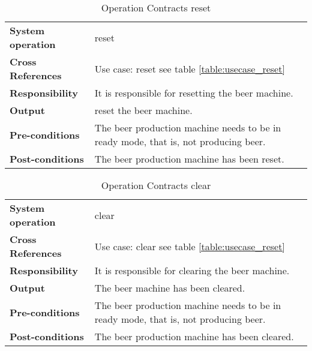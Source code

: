 \begin{table}[H]
    \begin{tabularx}{\textwidth}{|>{\RaggedRight}p{3.7cm}|>{\RaggedRight}X|}
        \hline
        \multicolumn{2}{|c|}{\textbf{reset}}\\
        \hline
        \textbf{System operation} & reset \\
        \hline
        \textbf{Cross References} & Use case: reset see table \ref{table:usecase_reset} \\
        \hline
        \textbf{Responsibility} & It is responsible for resetting the beer 
                machine.\\
        \hline
        \textbf{Output} & reset the beer machine. \\
        \hline
        \textbf{Pre-conditions} & The beer production machine needs to be in
                ready mode, that is, not producing beer. \\
        \hline
        \textbf{Post-conditions} & The beer production machine has been reset. \\
        \hline
    \end{tabularx}
    \caption{Operation Contracts reset} 
    \label{table:Operation_Contracts_reset}
\end{table}

\begin{table}[H]
    \begin{tabularx}{\textwidth}{|>{\RaggedRight}p{3.7cm}|>{\RaggedRight}X|}
        \hline
        \multicolumn{2}{|c|}{\textbf{clear}}\\
        \hline
        \textbf{System operation} & clear\\
        \hline
        \textbf{Cross References} & Use case: clear see table \ref{table:usecase_reset} \\
        \hline
        \textbf{Responsibility} & It is responsible for clearing the beer 
                machine. \\
        \hline
        \textbf{Output} & The beer machine has been cleared. \\
        \hline
        \textbf{Pre-conditions} & The beer production machine needs to be in
                ready mode, that is, not producing beer. \\
        \hline
        \textbf{Post-conditions} & The beer production machine has been cleared.\\
        \hline
    \end{tabularx}
    \caption{Operation Contracts clear} 
    \label{table:Operation_Contracts_clear}
\end{table}

